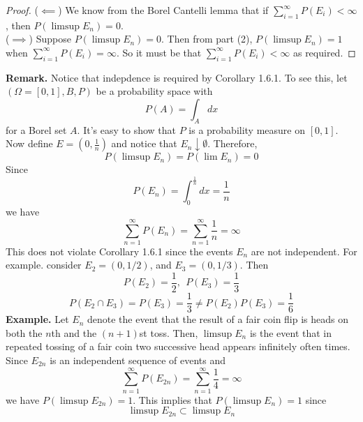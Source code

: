 \begin{proof}
    ($\impliedby$) We know from the Borel Cantelli lemma that if $\sum\limits_{i=1}^\infty P(E_i) < \infty$, then $P(\limsup E_n) = 0$.\\[1ex]
    ($\implies$) Suppose $P(\limsup E_n) = 0$. Then from part (2), $P(\limsup E_n) = 1$ when $\sum\limits_{i=1}^\infty P(E_i) = \infty$. So it must be that $\sum\limits_{i=1}^\infty P(E_i) < \infty$ as required. 
\end{proof}
\noindent
\textbf{Remark.} Notice that indepdence is required by Corollary 1.6.1. To see this, let $(\Omega = [0,1], B, P)$ be a probability space with 
\[P(A) = \int_A dx\]
for a Borel set $A$. It's easy to show that $P$ is a probability measure on $[0,1]$. Now define $E = \left(0, \frac{1}{n}\right)$ and notice that $E_n \downarrow \emptyset$. Therefore, 
\[P(\limsup E_n) = P(\lim E_n) = 0\]
Since 
\[P(E_n) = \int_0^\frac{1}{n} dx = \frac{1}{n}\]
we have 
\[\sum_{n=1}^\infty P(E_n) = \sum_{n=1}^\infty \frac{1}{n} = \infty\]
This does not violate Corollary 1.6.1 since the events $E_n$ are not independent. For example. consider $E_2 = (0,1/2)$, and $E_3 = (0,1/3)$. Then 
\[P(E_2) = \frac{1}{2}, \ \ P(E_3) = \frac{1}{3}\]
\[P(E_2 \cap E_3) = P(E_3) = \frac{1}{3} \neq P(E_2)P(E_3) = \frac{1}{6}\]
\textbf{Example.} Let $E_n$ denote the event that the result of a fair coin flip is heads on both the $n$th and the $(n + 1)$st toss. Then,
$\limsup E_n$ is the event that in repeated tossing of a fair coin two
successive head appears infinitely often times. Since ${E_{2n}}$ is an
independent sequence of events and
\[\sum_{n=1}^\infty P(E_{2n}) = \sum_{n=1}^\infty \frac{1}{4} = \infty\]
we have $P(\limsup E_{2n}) = 1$. This implies that $P(\limsup E_n) = 1$ since 
\[\limsup E_{2n} \subset \limsup E_n\]